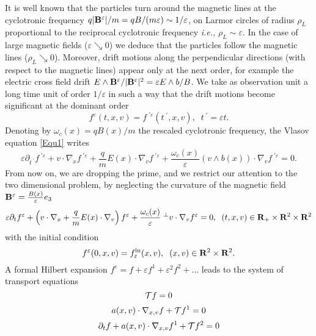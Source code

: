 \documentclass[12pt, a4paper]{article}
\providecommand\mathbb{\bf}
\newcommand\R{{\mathbb R}}
\newcommand{\eps}[0]{
\varepsilon}
\newcommand{\fe}[0]{
f ^\varepsilon}
\newcommand{\fo}[0]{
f ^1}
\newcommand{\fine}[0]{
f ^{\mathrm{in}}_{\varepsilon}}
\newcommand{\bB}[0]{
{\bold B}}
\newcommand{\oc}[0]{
\omega _c (x)}
\begin{document}
It is well known that the particles turn around the magnetic lines at the cyclotronic frequency $q |\bB ^\eps|/m = q B/(m \eps)  \sim 1/\eps$, on Larmor circles of radius $\rho _L$ proportional to the reciprocal cyclotronic frequency {\it i.e.,} $\rho _L \sim \eps$. In the case of large magnetic fields ($\eps \searrow 0$) we deduce that the particles follow the magnetic lines ($\rho _L \searrow 0 $). Moreover, drift motions along the perpendicular directions (with respect to the magnetic lines) appear only at the next order, for example the electric cross field drift $E \wedge \bB ^\eps /|\bB ^\eps |^2 = \eps E\wedge b /B$. We take as observation unit a long time unit of order $1/\eps$ in such a way that the drift motions become significant at the dominant order
\[
\fe (t,x,v) = f^{\;\prime \eps} (t^{\;\prime}, x, v),\;\;t ^{\;\prime} = \eps t.
\]
Denoting by $\oc = qB(x) /m$ the rescaled cyclotronic frequency, the Vlasov equation \eqref{Equ1} writes
\begin{equation}
\label{Equ3} \eps \partial _{t ^{\;\prime}} f^{\;\prime \eps} + v \cdot \nabla _x f^{\;\prime \eps} + \frac{q}{m} E(x) \cdot \nabla _v f^{\;\prime \eps} + \frac{\oc }{\eps} (v \wedge b(x) )\cdot \nabla _v f^{\;\prime \eps} = 0.
\end{equation}
From now on, we are dropping the prime, and we restrict our attention to the two dimensional problem, by neglecting the curvature of the magnetic field $\bB ^\eps = \frac{B(x)}{\eps} e_3$
\begin{equation}
\label{Equ4} \eps \partial _t \fe + \left (v \cdot \nabla _x + \frac{q}{m} E (x) \cdot \nabla _v     \right ) \fe + \frac{\oc }{\eps} \;^{\perp }v \cdot \nabla _v \fe = 0,\;\;(t,x,v) \in \R_+ \times \R ^2 \times \R ^2
\end{equation}
with the initial condition
\begin{equation}
\label{Equ5} \fe (0,x,v) = \fine (x,v),\;\;(x,v) \in \R ^2 \times \R ^2.
\end{equation}
A formal Hilbert expansion $\fe = f + \eps \fo + \eps ^2 f ^2 + ...$ leads to the system of transport equations
\begin{equation}
\label{Equ6} {\cal T} f = 0
\end{equation}
\begin{equation}
\label{Equ7} a(x,v) \cdot \nabla _{x,v} f + {\cal T} f^1  = 0
\end{equation}
\begin{equation}
\label{Equ8} \partial _t f + a(x,v) \cdot \nabla _{x,v} \fo + {\cal T} f^2 = 0
\end{equation}
\end{document}

